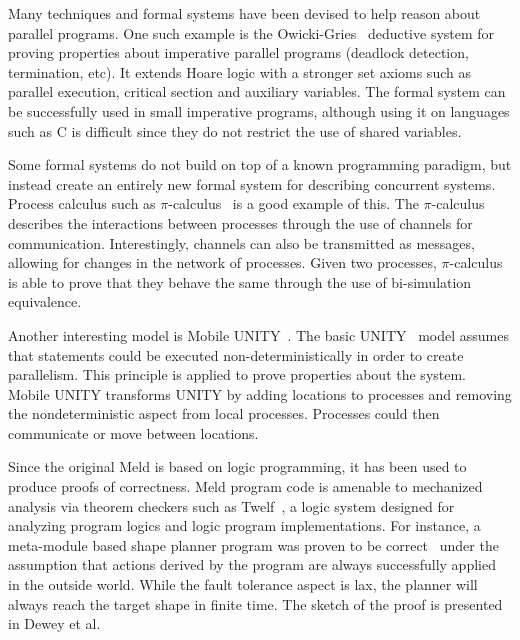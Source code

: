 Many techniques and formal systems have been devised to help reason about
parallel programs.  One such example is the
Owicki-Gries~\cite{Owicki:1976:VPP:360051.360224} deductive system for proving
properties about imperative parallel programs (deadlock detection, termination,
etc).  It extends Hoare logic with a stronger set axioms such as parallel
execution, critical section and auxiliary variables. The formal system can be
successfully used in small imperative programs, although using it on languages
such as C is difficult since they do not restrict the use of shared variables.

Some formal systems do not build on top of a known programming paradigm, but
instead create an entirely new formal system for describing concurrent systems.
Process calculus such as $\pi$-calculus~\cite{Milner:1999:CMS:329902} is a good
example of this.  The $\pi$-calculus describes the interactions between
processes through the use of channels for communication. Interestingly, channels
can also be transmitted as messages, allowing for changes in the network of
processes.  Given two processes, $\pi$-calculus is able to prove that they
behave the same through the use of bi-simulation equivalence.

Another interesting model is Mobile UNITY~\cite{Roman97anintroduction}. The
basic UNITY~\cite{UNITY} model assumes that statements could be executed
non-deterministically in order to create parallelism. This principle is applied
to prove properties about the system.  Mobile UNITY transforms UNITY by adding
locations to processes and removing the nondeterministic aspect from local
processes. Processes could then communicate or move between locations.

Since the original Meld is based on logic programming, it has been used to
produce proofs of correctness.  Meld program code is amenable to mechanized
analysis via theorem checkers such as Twelf~\cite{twelf}, a logic system
designed for analyzing program logics and logic program implementations.  For
instance, a meta-module based shape planner program was proven to be
correct~\cite{dewey-iros08,ashley-rollman-iclp09} under the assumption that
actions derived by the program are always successfully applied in the outside
world.  While the fault tolerance aspect is lax, the planner will always reach
the target shape in finite time.  The sketch of the proof is presented in Dewey
et al.~\cite{dewey-iros08}
